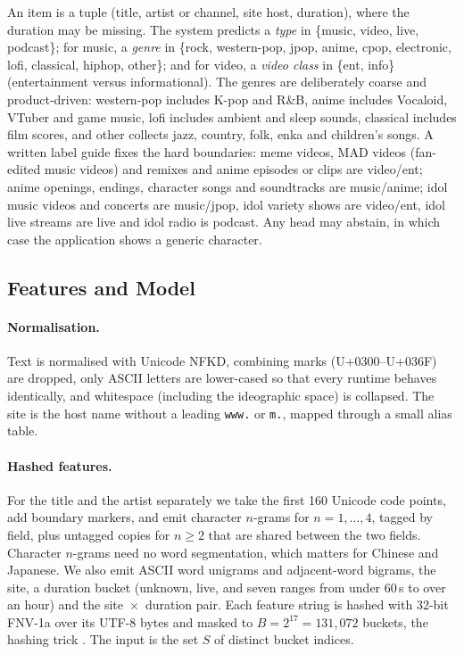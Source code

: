 \documentclass[11pt]{article}
\begin{document}
An item is a tuple (title, artist or channel, site host, duration), where the duration may be missing. The system predicts a \emph{type} in \{music, video, live, podcast\}; for music, a \emph{genre} in \{rock, western-pop, jpop, anime, cpop, electronic, lofi, classical, hiphop, other\}; and for video, a \emph{video class} in \{ent, info\} (entertainment versus informational). The genres are deliberately coarse and product-driven: western-pop includes K-pop and R\&B, anime includes Vocaloid, VTuber and game music, lofi includes ambient and sleep sounds, classical includes film scores, and other collects jazz, country, folk, enka and children's songs. A written label guide fixes the hard boundaries: meme videos, MAD videos (fan-edited music videos) and remixes and anime episodes or clips are video/ent; anime openings, endings, character songs and soundtracks are music/anime; idol music videos and concerts are music/jpop, idol variety shows are video/ent, idol live streams are live and idol radio is podcast. Any head may abstain, in which case the application shows a generic character.

\subsection{Features and Model}
\label{sec:model}

\paragraph{Normalisation.} Text is normalised with Unicode NFKD, combining marks (U+0300--U+036F) are dropped, only ASCII letters are lower-cased so that every runtime behaves identically, and whitespace (including the ideographic space) is collapsed. The site is the host name without a leading \texttt{www.} or \texttt{m.}, mapped through a small alias table.

\paragraph{Hashed features.} For the title and the artist separately we take the first 160 Unicode code points, add boundary markers, and emit character $n$-grams for $n = 1,\dots,4$, tagged by field, plus untagged copies for $n \ge 2$ that are shared between the two fields. Character $n$-grams need no word segmentation, which matters for Chinese and Japanese. We also emit ASCII word unigrams and adjacent-word bigrams, the site, a duration bucket (unknown, live, and seven ranges from under 60\,s to over an hour) and the site~$\times$~duration pair. Each feature string is hashed with 32-bit FNV-1a over its UTF-8 bytes and masked to $B = 2^{17} = 131{,}072$ buckets, the hashing trick \citep{weinberger2009feature}. The input is the set $S$ of distinct bucket indices.
\end{document}
